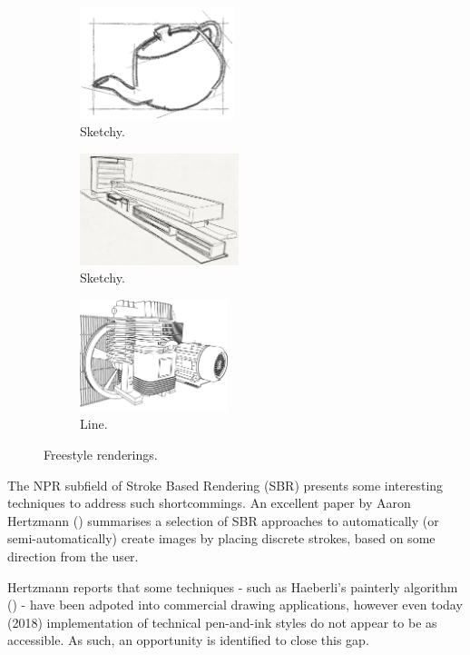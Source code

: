 \begin{figure}[h]
	\centering
	\begin{subfigure}[b]{0.3\textwidth}
		\includegraphics[height=3.25cm]{images/ex_sketchy1}
		\caption{Sketchy.}\label{ex_sketchy1}
	\end{subfigure}
	\begin{subfigure}[b]{0.3\textwidth}
		\includegraphics[height=3.25cm]{images/ex_sketchy2}
		\caption{Sketchy.}\label{ex_sketchy2}
	\end{subfigure}
	\begin{subfigure}[b]{0.3\textwidth}
		\includegraphics[height=3.25cm]{images/ex_line}
		\caption{Line.}\label{ex_line}
	\end{subfigure}
	\caption{Freestyle renderings.}
\end{figure}

The NPR subfield of Stroke Based Rendering (SBR) presents some interesting techniques to address such shortcommings.
An excellent paper by Aaron Hertzmann (\cite{hertzmann2002}) summarises a selection of SBR approaches to automatically (or semi-automatically) create images by placing discrete strokes, based on some direction from the user.

Hertzmann reports that some techniques - such as Haeberli's painterly algorithm (\cite{haeberli1990}) - have been adpoted into commercial drawing applications, however even today (2018) implementation of technical pen-and-ink styles do not appear to be as accessible.
As such, an opportunity is identified to close this gap.

